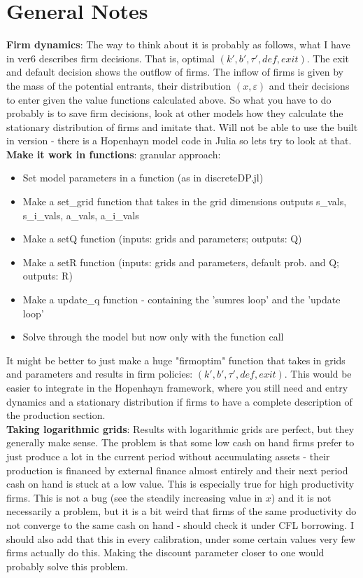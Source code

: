 \documentclass[12pt]{article}
\begin{document}
\newpage

\section*{General Notes}
\textbf{Firm dynamics}: The way to think about it is probably as follows, what I have in ver6 describes firm decisions. That is, optimal $(k',b', \tau', def, exit)$. The exit and default decision shows the outflow of firms. The inflow of firms is given by the mass of the potential entrants, their distribution $(x, \varepsilon)$ and their decisions to enter given the value functions calculated above. So what you have to do probably is to save firm decisions, look at other models how they calculate the stationary distribution of firms and imitate that. Will not be able to use the built in version - there is a Hopenhayn model code in Julia so lets try to look at that.  \vspace{3mm} \\
\noindent \textbf{Make it work in functions}: granular approach:
\begin{itemize}
    \item Set model parameters in a function (as in discreteDP.jl)
    \item Make a set\_grid function that takes in the grid dimensions outputs s\_vals, s\_i\_vals, a\_vals, a\_i\_vals
    \item Make a setQ function (inputs: grids and parameters; outputs: Q)
    \item Make a setR function (inputs: grids and parameters, default prob. and Q; outputs: R)
    \item Make a update\_q function - containing the 'sumres loop' and the 'update loop'
    \item Solve through the model but now only with the function call
\end{itemize}
It might be better to just make a huge "firmoptim" function that takes in grids and parameters and results in firm policies: $(k',b', \tau', def, exit)$. This would be easier to integrate in the Hopenhayn framework, where you still need and entry dynamics and a stationary distribution if firms to have a complete description of the production section. \vspace{3mm} \\
\textbf{Taking logarithmic grids}: Results with logarithmic grids are perfect, but they generally make sense. The problem is that some low cash on hand firms prefer to just produce a lot in the current period without accumulating assets - their production is financed by external finance almost entirely and their next period cash on hand is stuck at a low value. This is especially true for high productivity firms. This is not a bug (see the steadily increasing value in $x$) and it is not necessarily a problem, but it is a bit weird that firms of the same productivity do not converge to the same cash on hand - should check it under CFL borrowing. I should also add that this in every calibration, under some certain values very few firms actually do this. Making the discount parameter closer to one would probably solve this problem.   \vspace{3mm} \\
\end{document}
